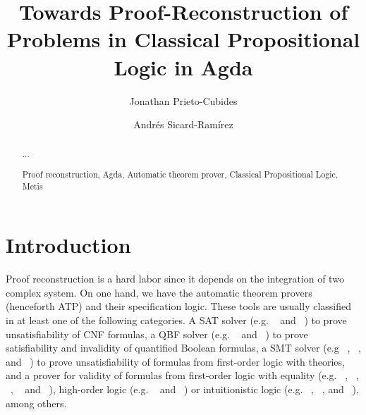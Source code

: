 \documentclass[runningheads,a4paper]{llncs}
\newcommand{\keywords}[1]{\par\addvspace\baselineskip
\noindent\keywordname\enspace\ignorespaces#1}
\begin{document}
\mainmatter  %

\title{Towards Proof-Reconstruction of Problems in Classical Propositional Logic
in Agda}


\author{Jonathan Prieto-Cubides%
\and Andr\'es Sicard-Ram\'irez}
%


\maketitle


\begin{abstract}
...
\keywords{Proof reconstruction, Agda, Automatic theorem prover,
  Classical Propositional Logic, Metis }
\end{abstract}

\section{Introduction}
Proof reconstruction is a hard labor since it depends on the integration of two
complex system. On one hand, we have the automatic theorem provers
(henceforth ATP) and their specification logic. These tools are usually
classified in at least one of the following categories.
A SAT solver (e.g. ~\cite{Moskewicz2001} and 
~\cite{Een2004}) to prove unsatisfiability of CNF formulas, a QBF solver
(e.g. ~\cite{Klieber2014} and ~\cite{Lonsing2017})
to prove satisfiability and invalidity of quantified Boolean formulas, a SMT
solver (e.g ~\cite{Barrett2011}, ~\cite{bouton2009}, and
~\cite{DeMoura2008}) to prove unsatisfiability of formulas from
first-order logic with theories, and a prover for validity of formulas from
first-order logic with equality (e.g. ~\cite{Schulz:AICOM-2002},
~\cite{Otten2008}, ~\cite{hurd2003first}, 
~\cite{Weidenbach2009} and ~\cite{Riazanov1999}), high-order logic
(e.g. ~\cite{Benzmuller2008} and ~\cite{Brown2012})
or intuitionistic logic (e.g. ~\cite{Otten2008},
~\cite{Schmitt2001}, and ~\cite{Tammet1997}), among others.
\end{document}
